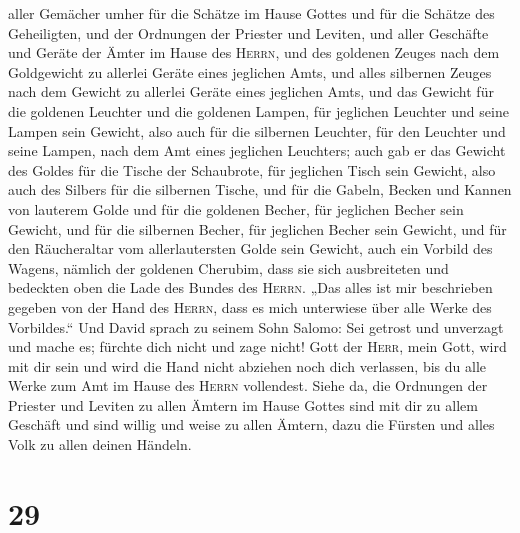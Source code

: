 aller Gemächer umher für die Schätze im Hause Gottes und für die Schätze
des Geheiligten,  und der Ordnungen der Priester und
Leviten, und aller Geschäfte und Geräte der Ämter im Hause des
\textsc{Herrn},  und des goldenen Zeuges nach dem
Goldgewicht zu allerlei Geräte eines jeglichen Amts, und alles silbernen
Zeuges nach dem Gewicht zu allerlei Geräte eines jeglichen Amts,
 und das Gewicht für die goldenen Leuchter und die
goldenen Lampen, für jeglichen Leuchter und seine Lampen sein Gewicht,
also auch für die silbernen Leuchter, für den Leuchter und seine Lampen,
nach dem Amt eines jeglichen Leuchters;  auch gab er das
Gewicht des Goldes für die Tische der Schaubrote, für jeglichen Tisch
sein Gewicht, also auch des Silbers für die silbernen Tische,
 und für die Gabeln, Becken und Kannen von lauterem Golde
und für die goldenen Becher, für jeglichen Becher sein Gewicht, und für
die silbernen Becher, für jeglichen Becher sein Gewicht, 
und für den Räucheraltar vom allerlautersten Golde sein Gewicht, auch
ein Vorbild des Wagens, nämlich der goldenen Cherubim, dass sie sich
ausbreiteten und bedeckten oben die Lade des Bundes des \textsc{Herrn}.
 „Das alles ist mir beschrieben gegeben von der Hand des
\textsc{Herrn}, dass es mich unterwiese über alle Werke des Vorbildes.``
 Und David sprach zu seinem Sohn Salomo: Sei getrost und
unverzagt und mache es; fürchte dich nicht und zage nicht! Gott der
\textsc{Herr}, mein Gott, wird mit dir sein und wird die Hand nicht
abziehen noch dich verlassen, bis du alle Werke zum Amt im Hause des
\textsc{Herrn} vollendest.  Siehe da, die Ordnungen der
Priester und Leviten zu allen Ämtern im Hause Gottes sind mit dir zu
allem Geschäft und sind willig und weise zu allen Ämtern, dazu die
Fürsten und alles Volk zu allen deinen Händeln.

\hypertarget{section-28}{%
\section{29}\label{section-28}}

